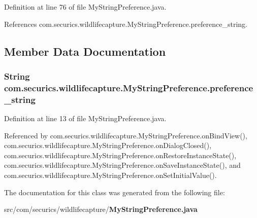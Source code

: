 Definition at line 76 of file My\+String\+Preference.\+java.



References com.\+securics.\+wildlifecapture.\+My\+String\+Preference.\+preference\+\_\+string.



\subsection{Member Data Documentation}
\subsubsection[{preference\+\_\+string}]{\setlength{\rightskip}{0pt plus 5cm}String com.\+securics.\+wildlifecapture.\+My\+String\+Preference.\+preference\+\_\+string\hspace{0.3cm}{\ttfamily [private]}}\label{classcom_1_1securics_1_1wildlifecapture_1_1_my_string_preference_ae18f2dfcbea2946ec13ba306e73077e3}


Definition at line 13 of file My\+String\+Preference.\+java.



Referenced by com.\+securics.\+wildlifecapture.\+My\+String\+Preference.\+on\+Bind\+View(), com.\+securics.\+wildlifecapture.\+My\+String\+Preference.\+on\+Dialog\+Closed(), com.\+securics.\+wildlifecapture.\+My\+String\+Preference.\+on\+Restore\+Instance\+State(), com.\+securics.\+wildlifecapture.\+My\+String\+Preference.\+on\+Save\+Instance\+State(), and com.\+securics.\+wildlifecapture.\+My\+String\+Preference.\+on\+Set\+Initial\+Value().



The documentation for this class was generated from the following file\+:\begin{DoxyCompactItemize}
\item 
src/com/securics/wildlifecapture/{\bf My\+String\+Preference.\+java}\end{DoxyCompactItemize}
